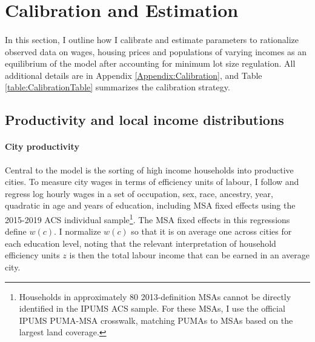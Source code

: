 \documentclass[12pt]{article}
\begin{document}

\section{Calibration and Estimation}\label{Section:CalibrationEstimation}

\paragraph{}
In this section, I outline how I calibrate and estimate parameters to rationalize observed data on wages, housing prices and populations of varying incomes as an equilibrium of the model after accounting for minimum lot size regulation. All additional details are in Appendix \ref{Appendix:Calibration}, and Table \ref{table:CalibrationTable} summarizes the calibration strategy.

\subsection{Productivity and local income distributions}

\paragraph*{City productivity}\label{Calibration:CityProd} Central to the model is the sorting of high income households into productive cities. To measure city wages in terms of efficiency units of labour, I follow \cite{ineqincreased} and regress log hourly wages in a set of occupation, sex, race, ancestry, year, quadratic in age and years of education, including MSA fixed effects using the 2015-2019 ACS individual sample\footnote{Households in approximately 80 2013-definition MSAs cannot be directly identified in the IPUMS ACS sample. For these MSAs, I use the official IPUMS PUMA-MSA crosswalk, matching PUMAs to MSAs based on the largest land coverage.}. The MSA fixed effects in this regressions define $w(c)$. I normalize $w(c)$ so that it is on average one across cities for each education level, noting that the relevant interpretation of household efficiency units $z$ is then the total labour income that can be earned in an average city. 
\end{document}
